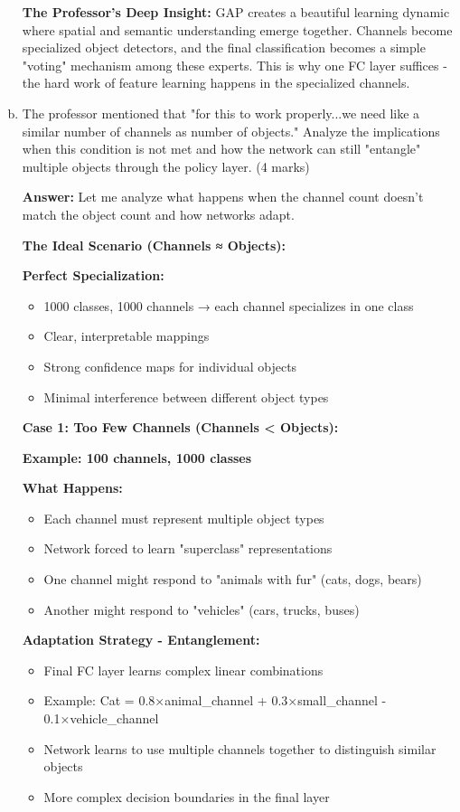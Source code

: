 \documentclass[12pt]{article}
\newcommand{\answer}[1]{{\color{answercolor}\textbf{Answer:} #1}}
\newcommand{\explanation}[1]{{\color{explanationcolor}#1}}
\begin{document}
\begin{enumerate}[(a)]
{    \textbf{The Professor's Deep Insight:}
    \explanation{
    GAP creates a beautiful learning dynamic where spatial and semantic understanding emerge together. Channels become specialized object detectors, and the final classification becomes a simple "voting" mechanism among these experts. This is why one FC layer suffices - the hard work of feature learning happens in the specialized channels.
    }
    }
    
    \item The professor mentioned that "for this to work properly...we need like a similar number of channels as number of objects." Analyze the implications when this condition is not met and how the network can still "entangle" multiple objects through the policy layer. \hfill (4 marks)
    
    \answer{
    Let me analyze what happens when the channel count doesn't match the object count and how networks adapt.
    
    \textbf{The Ideal Scenario (Channels ≈ Objects):}
    
    \explanation{
    \textbf{Perfect Specialization:}
    \begin{itemize}
        \item 1000 classes, 1000 channels → each channel specializes in one class
        \item Clear, interpretable mappings
        \item Strong confidence maps for individual objects
        \item Minimal interference between different object types
    \end{itemize}
    }
    
    \textbf{Case 1: Too Few Channels (Channels < Objects):}
    
    \explanation{
    \textbf{Example: 100 channels, 1000 classes}
    
    \textbf{What Happens:}
    \begin{itemize}
        \item Each channel must represent multiple object types
        \item Network forced to learn "superclass" representations
        \item One channel might respond to "animals with fur" (cats, dogs, bears)
        \item Another might respond to "vehicles" (cars, trucks, buses)
    \end{itemize}
    
    \textbf{Adaptation Strategy - Entanglement:}
    \begin{itemize}
        \item Final FC layer learns complex linear combinations
        \item Example: Cat = 0.8×animal_channel + 0.3×small_channel - 0.1×vehicle_channel
        \item Network learns to use multiple channels together to distinguish similar objects
        \item More complex decision boundaries in the final layer
    \end{itemize}
    
}}
\end{enumerate}
\end{document}
